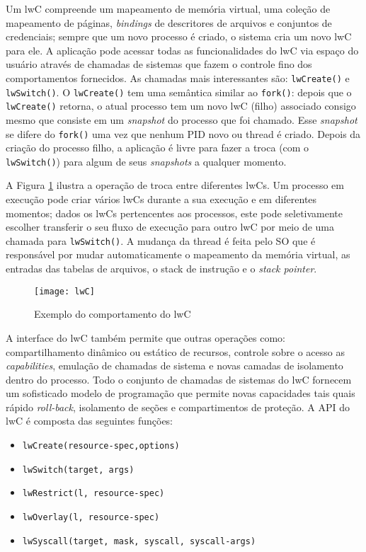 Um lwC compreende um mapeamento de memória virtual, uma coleção de mapeamento
de páginas, \emph{bindings} de descritores de arquivos e conjuntos de
credenciais; sempre que um novo processo é criado, o sistema cria um novo lwC
para ele. A aplicação pode acessar todas as funcionalidades do lwC via espaço
do usuário através de chamadas de sistemas que fazem o controle fino dos
comportamentos fornecidos.  As chamadas mais interessantes são:
\texttt{lwCreate()} e \texttt{lwSwitch()}. O \texttt{lwCreate()} tem uma
semântica similar ao \texttt{fork()}: depois que o \texttt{lwCreate()} retorna,
o atual processo tem um novo lwC (filho) associado consigo mesmo que consiste
em um \emph{snapshot} do processo que foi chamado. Esse \emph{snapshot} se
difere do \texttt{fork()} uma vez que nenhum PID novo ou thread é criado.
Depois da criação do processo filho, a aplicação é livre para fazer a troca
(com o \texttt{lwSwitch()}) para algum de seus \emph{snapshots} a qualquer
momento.

A Figura \ref{fig:lwc} ilustra a operação de troca entre diferentes lwCs. Um
processo em execução pode criar vários lwCs durante a sua execução e em
diferentes momentos; dados os lwCs pertencentes aos processos, este pode
seletivamente escolher transferir o seu fluxo de execução para outro lwC por
meio de uma chamada para \texttt{lwSwitch()}. A mudança da thread é feita pelo
SO que é responsável por mudar automaticamente o mapeamento da memória virtual,
as entradas das tabelas de arquivos, o stack de instrução e o \emph{stack
pointer}.

\begin{figure}[!h]
  \centering
  \texttt{[image: lwC]} 
  \caption{Exemplo do comportamento do lwC}
  \label{fig:lwc} 
\end{figure}

A interface do lwC também permite que outras operações como: compartilhamento
dinâmico ou estático de recursos, controle sobre o acesso as
\emph{capabilities}, emulação de chamadas de sistema e novas camadas de
isolamento dentro do processo. Todo o conjunto de chamadas de sistemas do lwC
fornecem um sofisticado modelo de programação que permite novas capacidades
tais quais rápido \emph{roll-back}, isolamento de seções e compartimentos de
proteção. A API do lwC é composta das seguintes funções:

\begin{itemize}
  \item \texttt{lwCreate(resource-spec,options)}
  \item \texttt{lwSwitch(target, args)}
  \item \texttt{lwRestrict(l, resource-spec)}
  \item \texttt{lwOverlay(l, resource-spec)}
  \item \texttt{lwSyscall(target, mask, syscall, syscall-args)}
\end{itemize}


